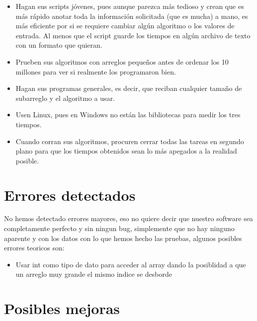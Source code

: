 \documentclass[12pt, fleqn]{report}                             %
\theoremstyle{break}                                            %
\begin{document}
\begin{enumerate}
	                \begin{itemize}\setlength\itemsep{0em}
	                    \item Hagan sus scripts jóvenes, pues aunque parezca más tedioso y crean que es más rápido anotar toda la información solicitada (que es mucha) a mano, es más eficiente por si se requiere cambiar algún algoritmo o los valores de entrada. Al menos que el script guarde los tiempos en algún archivo de texto con un formato que quieran.
	                    \item Prueben sus algoritmos con arreglos pequeños antes de ordenar los 10 millones para ver si realmente los programaron bien.
	                    \item Hagan sus programas generales, es decir, que reciban cualquier tamaño de subarreglo y el algoritmo a usar.
	                    \item Usen Linux, pues en Windows no están las bibliotecas para medir los tres tiempos.
	                    \item Cuando corran sus algoritmos, procuren cerrar todas las tareas en segundo plano para que los tiempos obtenidos sean lo más apegados a la realidad posible.
	                \end{itemize}
	            
	        \end{enumerate}
	
	\section{Errores detectados}
        No hemos detectado errores mayores, eso no quiere decir que nuestro software sea completamente
        perfecto y sin ningun bug, simplemente que no hay ninguno aparente y con los datos con lo que
        hemos hecho las pruebas, algunos posibles errores teoricos son:
        
        \begin{itemize}
            \item Usar int como tipo de dato para acceder al array dando la posiblidad a que un arreglo muy grande el mismo indice se desborde
        \end{itemize}
	
	
	\section{Posibles mejoras}
	    
\end{document}
